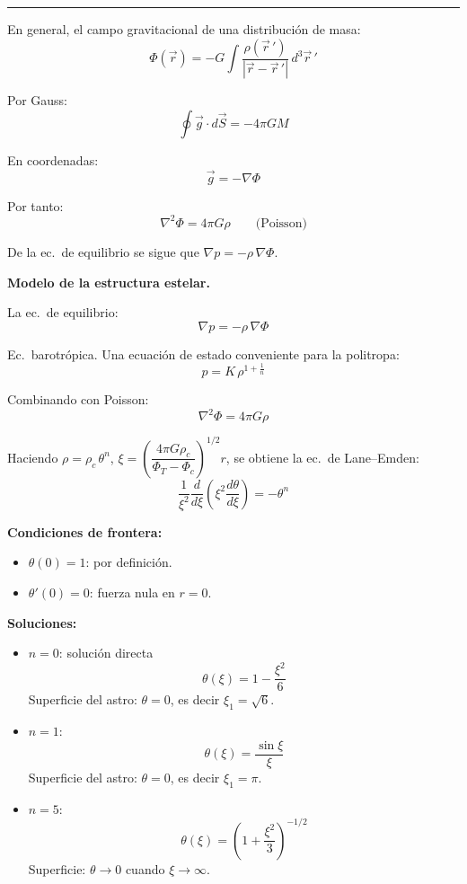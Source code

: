 \vspace{1em}

\noindent\rule{\textwidth}{0.4pt}

\vspace{1em}


\vspace{1em}

En general, el campo gravitacional de una distribución de masa:
$$
\Phi(\vec{r}) = -G\int \frac{\rho(\vec{r}\,')}{|\vec{r}-\vec{r}\,'|}\,d^3\vec{r}\,'
$$

Por Gauss:
$$
\oint \vec{g}\cdot d\vec{S} = -4\pi G M
$$

En coordenadas:
$$
\vec{g} = -\nabla\Phi
$$

Por tanto:
$$
\boxed{\nabla^2\Phi = 4\pi G\rho}
\qquad \text{(Poisson)}
$$

De la ec.\ de equilibrio se sigue que $\nabla p = -\rho\,\nabla\Phi$.

\vspace{1em}

\noindent\textbf{Modelo de la estructura estelar.}

La ec.\ de equilibrio:
$$
\nabla p = -\rho\,\nabla\Phi
$$

Ec.\ barotrópica. Una ecuación de estado conveniente para la politropa:
$$
p = K\,\rho^{1+\frac{1}{n}}
$$

Combinando con Poisson:
$$
\nabla^2\Phi = 4\pi G\rho
$$

Haciendo $\rho = \rho_c\,\theta^n$, $\xi = \left(\dfrac{4\pi G\rho_c}{\Phi_T - \Phi_c}\right)^{1/2}r$, se obtiene la ec.\ de Lane--Emden:
$$
\boxed{\frac{1}{\xi^2}\frac{d}{d\xi}\!\left(\xi^2\frac{d\theta}{d\xi}\right) = -\theta^n}
$$

\vspace{1em}

\noindent\textbf{Condiciones de frontera:}

\begin{itemize}
    \item $\theta(0) = 1$: por definición.
    \item $\theta'(0) = 0$: fuerza nula en $r = 0$.
\end{itemize}

\vspace{1em}

\noindent\textbf{Soluciones:}

\begin{itemize}
    \item $n = 0$: solución directa
    $$
    \theta(\xi) = 1 - \frac{\xi^2}{6}
    $$
    Superficie del astro: $\theta = 0$, es decir $\xi_1 = \sqrt{6}$.

    \item $n = 1$:
    $$
    \theta(\xi) = \frac{\sin\xi}{\xi}
    $$
    Superficie del astro: $\theta = 0$, es decir $\xi_1 = \pi$.

    \item $n = 5$:
    $$
    \theta(\xi) = \left(1 + \frac{\xi^2}{3}\right)^{-1/2}
    $$
    Superficie: $\theta \to 0$ cuando $\xi \to \infty$.
\end{itemize}